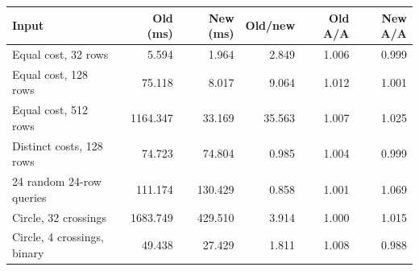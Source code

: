 \begin{tabular}{lrrrrr}
\toprule
Input & Old (ms) & New (ms) & Old/new & Old A/A & New A/A \\
\midrule
Equal cost, 32 rows & 5.594 & 1.964 & 2.849 & 1.006 & 0.999 \\
Equal cost, 128 rows & 75.118 & 8.017 & 9.064 & 1.012 & 1.001 \\
Equal cost, 512 rows & 1164.347 & 33.169 & 35.563 & 1.007 & 1.025 \\
Distinct costs, 128 rows & 74.723 & 74.804 & 0.985 & 1.004 & 0.999 \\
24 random 24-row queries & 111.174 & 130.429 & 0.858 & 1.001 & 1.069 \\
Circle, 32 crossings & 1683.749 & 429.510 & 3.914 & 1.000 & 1.015 \\
Circle, 4 crossings, binary & 49.438 & 27.429 & 1.811 & 1.008 & 0.988 \\
\bottomrule
\end{tabular}
